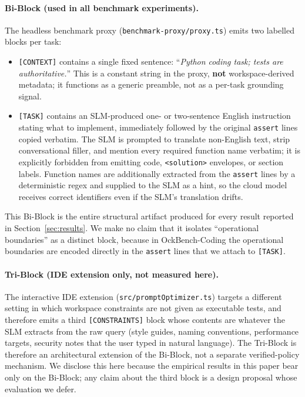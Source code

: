 \documentclass[11pt,a4paper,twocolumn]{article}
\begin{document}
\paragraph{Bi-Block (used in all benchmark experiments).} The headless benchmark proxy (\texttt{benchmark-proxy/proxy.ts}) emits two labelled blocks per task:
\begin{itemize}
    \item \texttt{[CONTEXT]} contains a single fixed sentence: ``\textit{Python coding task; tests are authoritative.}'' This is a constant string in the proxy, \textbf{not} workspace-derived metadata; it functions as a generic preamble, not as a per-task grounding signal.
    \item \texttt{[TASK]} contains an SLM-produced one- or two-sentence English instruction stating what to implement, immediately followed by the original \texttt{assert} lines copied verbatim. The SLM is prompted to translate non-English text, strip conversational filler, and mention every required function name verbatim; it is explicitly forbidden from emitting code, \texttt{<solution>} envelopes, or section labels. Function names are additionally extracted from the \texttt{assert} lines by a deterministic regex and supplied to the SLM as a hint, so the cloud model receives correct identifiers even if the SLM's translation drifts.
\end{itemize}

This Bi-Block is the entire structural artifact produced for every result reported in Section~\ref{sec:results}. We make no claim that it isolates ``operational boundaries'' as a distinct block, because in OckBench-Coding the operational boundaries are encoded directly in the \texttt{assert} lines that we attach to \texttt{[TASK]}.

\paragraph{Tri-Block (IDE extension only, not measured here).} The interactive IDE extension (\texttt{src/promptOptimizer.ts}) targets a different setting in which workspace constraints are not given as executable tests, and therefore emits a third \texttt{[CONSTRAINTS]} block whose contents are whatever the SLM extracts from the raw query (style guides, naming conventions, performance targets, security notes that the user typed in natural language). The Tri-Block is therefore an architectural extension of the Bi-Block, not a separate verified-policy mechanism. We disclose this here because the empirical results in this paper bear only on the Bi-Block; any claim about the third block is a design proposal whose evaluation we defer.
\end{document}
